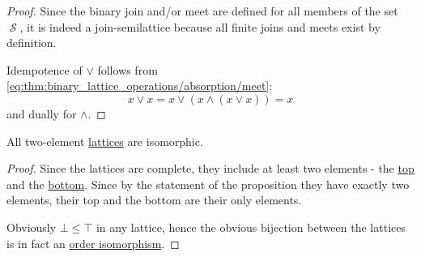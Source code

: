 \begin{proof}
   Since the binary join and/or meet are defined for all members of the set \( \mscrS \), it is indeed a join-semilattice because all finite joins and meets exist by definition.

  Idempotence of \( \vee \) follows from \eqref{eq:thm:binary_lattice_operations/absorption/meet}:
  \begin{equation*}
    x \vee x = x \vee (x \wedge (x \vee x)) = x
  \end{equation*}
  and dually for \( \wedge \).
\end{proof}

\begin{proposition}\label{thm:binary_lattices_are_isomorphic}
  All two-element \hyperref[def:semilattice/lattice]{lattices} are isomorphic.
\end{proposition}
\begin{proof}
  Since the lattices are complete, they include at least two elements - the \hyperref[def:semilattice/top]{top} and the \hyperref[def:semilattice/bottom]{bottom}. Since by the statement of the proposition they have exactly two elements, their top and the bottom are their only elements.

  Obviously \( \bot \leq \top \) in any lattice, hence the obvious bijection between the lattices is in fact an \hyperref[def:preordered_set/homomorphism]{order isomorphism}.
\end{proof}

